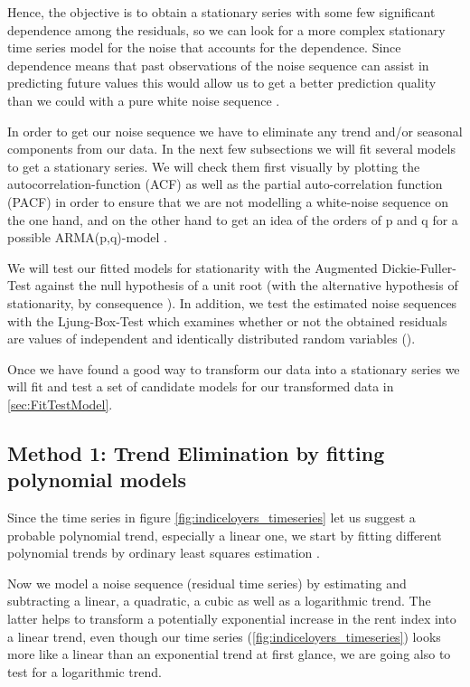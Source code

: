 \documentclass[11pt,a4paper]{article}
\begin{document}
Hence, the objective is to obtain a stationary series with some few significant dependence among the residuals, so we can look for a more complex stationary time series model for the noise that accounts for the dependence.
Since dependence means that past observations of the noise sequence can assist in predicting future values this would allow us to get a better prediction quality than we could with a pure white noise sequence \cite[p.~35]{bd02}.

In order to get our noise sequence we have to eliminate any trend and/or seasonal components from our data.
In the next few subsections we will fit several models to get a stationary series. We will check them first visually by plotting the autocorrelation-function (ACF) as well as the partial auto-correlation function (PACF) in order to ensure that we are not modelling a white-noise sequence on the one hand, and on the other hand to get an idea of the orders of p and q for a possible ARMA(p,q)-model \cite[pp.~83--110]{bd02}.

We will test our fitted models for stationarity with the Augmented Dickie-Fuller-Test against the null hypothesis of a unit root (with the alternative hypothesis of stationarity, by consequence \citep{adf}). In addition, we test the estimated noise sequences with the Ljung-Box-Test which examines whether or not the obtained residuals are values of independent and identically distributed random variables (\citep{LjungBox78}).

Once we have found a good way to transform our data into a stationary series we will fit and test a set of candidate models for our transformed data in \cref{sec:FitTestModel}.



\subsection{Method 1: Trend Elimination by fitting polynomial models}

Since the time series in figure \ref{fig:indiceloyers_timeseries} let us suggest a probable polynomial trend, especially a linear one, we start by fitting different polynomial trends by ordinary least squares estimation \cite[p.~11]{htf09}.

Now we model a noise sequence (residual time series) by estimating and subtracting a linear, a quadratic, a cubic as well as a logarithmic trend.
The latter  helps to transform a potentially exponential increase in the rent index into a linear trend, even though our time series (\cref{fig:indiceloyers_timeseries}) looks more like a linear than an exponential trend at first glance, we are going also to test for a logarithmic trend.
\end{document}
